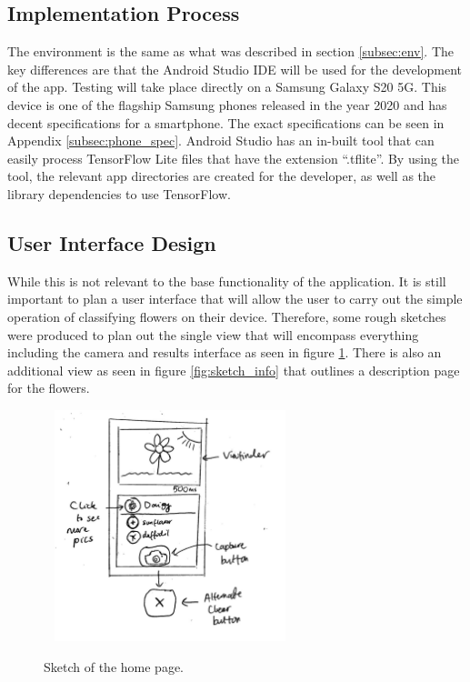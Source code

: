 \documentclass[12pt,a4paper]{report}
\begin{document}
\subsection{Implementation Process}

The environment is the same as what was described in section \ref{subsec:env}. The key differences are that the Android 
Studio IDE will be used for the development of the app. Testing will take place directly on a Samsung Galaxy S20 5G. 
This device is one of the flagship Samsung phones released in the year 2020 and has decent specifications for a 
smartphone. The exact specifications can be seen in Appendix \ref{subsec:phone_spec}. Android Studio has an in-built 
tool that can easily process TensorFlow Lite files that have the extension “.tflite”. By using the tool, the relevant 
app directories are created for the developer, as well as the library dependencies to use TensorFlow.

\subsection{User Interface Design}

While this is not relevant to the base functionality of the application. It is still important to plan a user interface 
that will allow the user to carry out the simple operation of classifying flowers on their device. Therefore, some rough
sketches were produced to plan out the single view that will encompass everything including the camera and results interface as 
seen in figure \ref{fig:sketch_main}. There is also an additional view as seen in figure \ref{fig:sketch_info} that outlines a description page for the 
flowers.

\begin{figure}[h]\
    \centering
    \includegraphics[width=0.6\textwidth]{Main_Sketch.jpg}
    \caption{Sketch of the home page.}
    \label{fig:sketch_main}
\end{figure}
\end{document}
